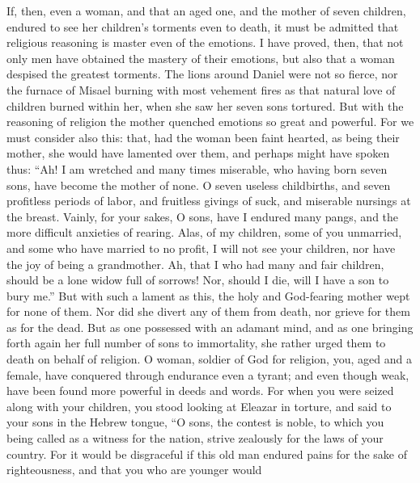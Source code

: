  If, then, even a woman, and that an aged one, and the
mother of seven children, endured to see her children's torments even to
death, it must be admitted that religious reasoning is master even of
the emotions.  I have proved, then, that not only men have
obtained the mastery of their emotions, but also that a woman despised
the greatest torments.  The lions around Daniel were not
so fierce, nor the furnace of Misael burning with most vehement fires as
that natural love of children burned within her, when she saw her seven
sons tortured.  But with the reasoning of religion the
mother quenched emotions so great and powerful.  For we
must consider also this: that, had the woman been faint hearted, as
being their mother, she would have lamented over them, and perhaps might
have spoken thus:  ``Ah! I am wretched and many times
miserable, who having born seven sons, have become the mother of none.
 O seven useless childbirths, and seven profitless periods
of labor, and fruitless givings of suck, and miserable nursings at the
breast.  Vainly, for your sakes, O sons, have I endured
many pangs, and the more difficult anxieties of rearing. 
Alas, of my children, some of you unmarried, and some who have married
to no profit, I will not see your children, nor have the joy of being a
grandmother.  Ah, that I who had many and fair children,
should be a lone widow full of sorrows!  Nor, should I
die, will I have a son to bury me.'' But with such a lament as this, the
holy and God-fearing mother wept for none of them.  Nor
did she divert any of them from death, nor grieve for them as for the
dead.  But as one possessed with an adamant mind, and as
one bringing forth again her full number of sons to immortality, she
rather urged them to death on behalf of religion.  O
woman, soldier of God for religion, you, aged and a female, have
conquered through endurance even a tyrant; and even though weak, have
been found more powerful in deeds and words.  For when
you were seized along with your children, you stood looking at Eleazar
in torture, and said to your sons in the Hebrew tongue, 
``O sons, the contest is noble, to which you being called as a witness
for the nation, strive zealously for the laws of your country.
 For it would be disgraceful if this old man endured
pains for the sake of righteousness, and that you who are younger would
